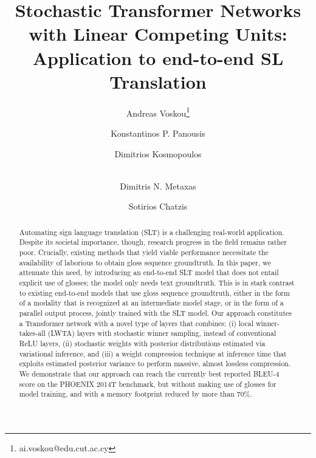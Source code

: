 \documentclass[10pt,twocolumn,letterpaper]{article}
\begin{document}
\title{Stochastic Transformer Networks
with Linear Competing Units: Application to end-to-end SL Translation}






\newcommand*\samethanks[1][\value{footnote}]{\footnotemark[#1]}
\author[1]{Andreas Voskou\thanks{ ai.voskou@edu.cut.ac.cy} }

\author[1]{Konstantinos P. Panousis}
\author[2]{Dimitrios Kosmopoulos}
\author[3]{\\Dimitris N. Metaxas}
\author[1]{Sotirios Chatzis}





{
    \makeatletter
    \renewcommand\AB@affilsepx{: \protect\Affilfont}
    \makeatother



    \makeatletter
    \renewcommand\AB@affilsepx{, \protect\Affilfont}
    \makeatother


}

\maketitle
\ificcvfinal\thispagestyle{empty}\fi

\begin{abstract}
   Automating sign language translation (SLT) is a challenging real-world application. Despite its societal importance, though, research progress in the field remains rather poor. Crucially, existing methods that yield viable performance necessitate the availability of laborious to obtain gloss sequence groundtruth. In this paper, we attenuate this need, by introducing an end-to-end SLT model that does not entail explicit use of glosses; the model only needs text groundtruth. This is in stark contrast to existing end-to-end models that use gloss sequence groundtruth, either in the form of a modality that is recognized at an intermediate model stage, or in the form of a parallel output process, jointly trained with the SLT model. Our  approach constitutes a Transformer network with a novel type of layers that combines: (i) local winner-takes-all (LWTA) layers with stochastic winner sampling, instead of conventional ReLU layers, (ii) stochastic weights with posterior distributions estimated via variational inference, and (iii) a weight compression technique at inference time that exploits estimated posterior variance to perform massive, almost lossless compression. We demonstrate that our approach can reach the currently best reported BLEU-4 score on the PHOENIX 2014T benchmark, but without making use of glosses for  model  training, and with a memory footprint reduced by more than 70\%.
\end{abstract}
\end{document}
